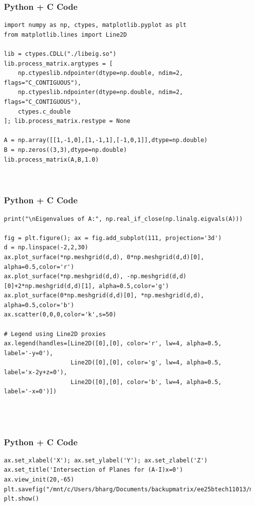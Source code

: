 \documentclass{beamer}
\begin{document}
\begin{frame}[fragile]
    \frametitle{Python + C Code}
    \begin{lstlisting}
import numpy as np, ctypes, matplotlib.pyplot as plt
from matplotlib.lines import Line2D

lib = ctypes.CDLL("./libeig.so")
lib.process_matrix.argtypes = [
    np.ctypeslib.ndpointer(dtype=np.double, ndim=2, flags="C_CONTIGUOUS"),
    np.ctypeslib.ndpointer(dtype=np.double, ndim=2, flags="C_CONTIGUOUS"),
    ctypes.c_double
]; lib.process_matrix.restype = None

A = np.array([[1,-1,0],[1,-1,1],[-1,0,1]],dtype=np.double)
B = np.zeros((3,3),dtype=np.double)
lib.process_matrix(A,B,1.0)



    \end{lstlisting}
\end{frame}
\begin{frame}[fragile]
    \frametitle{Python + C Code}
    \begin{lstlisting}
print("\nEigenvalues of A:", np.real_if_close(np.linalg.eigvals(A)))

fig = plt.figure(); ax = fig.add_subplot(111, projection='3d')
d = np.linspace(-2,2,30)
ax.plot_surface(*np.meshgrid(d,d), 0*np.meshgrid(d,d)[0], alpha=0.5,color='r')
ax.plot_surface(*np.meshgrid(d,d), -np.meshgrid(d,d)[0]+2*np.meshgrid(d,d)[1], alpha=0.5,color='g')
ax.plot_surface(0*np.meshgrid(d,d)[0], *np.meshgrid(d,d), alpha=0.5,color='b')
ax.scatter(0,0,0,color='k',s=50)

# Legend using Line2D proxies
ax.legend(handles=[Line2D([0],[0], color='r', lw=4, alpha=0.5, label='-y=0'),
                   Line2D([0],[0], color='g', lw=4, alpha=0.5, label='x-2y+z=0'),
                   Line2D([0],[0], color='b', lw=4, alpha=0.5, label='-x=0')])




    \end{lstlisting}
\end{frame}
\begin{frame}[fragile]
    \frametitle{Python + C Code}
    \begin{lstlisting}
ax.set_xlabel('X'); ax.set_ylabel('Y'); ax.set_zlabel('Z')
ax.set_title('Intersection of Planes for (A-I)x=0')
ax.view_init(20,-65)
plt.savefig("/mnt/c/Users/bharg/Documents/backupmatrix/ee25btech11013/matgeo/12.755/figs/Figure_1.png")
plt.show()
    \end{lstlisting}
\end{frame}
\end{document}
